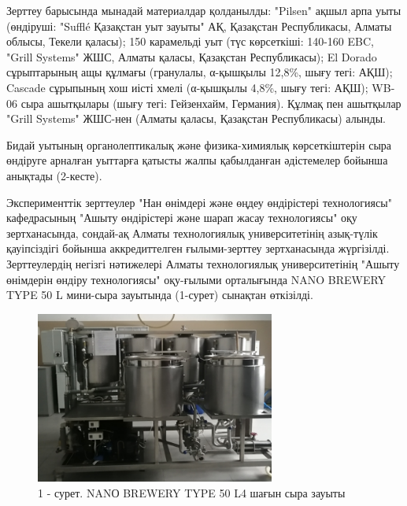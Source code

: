 \begin{multicols}{2}
Зерттеу барысында мынадай материалдар қолданылды: "Pilsen" ақшыл арпа
уыты (өндіруші: "Sufflé Қазақстан уыт зауыты" АҚ, Қазақстан
Республикасы, Алматы облысы, Текели қаласы); 150 карамельді уыт (түс
көрсеткіші: 140-160 EBC, "Grill Systems" ЖШС, Алматы қаласы, Қазақстан
Республикасы); El Dorado сұрыптарының ащы құлмағы (гранулалы, α-қышқылы
12,8\%, шығу тегі: АҚШ); Cascade сұрыпының хош иісті хмелі (α-қышқылы
4,8\%, шығу тегі: АҚШ); WB-06 сыра ашытқылары (шығу тегі: Гейзенхайм,
Германия). Құлмақ пен ашытқылар "Grill Systems" ЖШС-нен (Алматы қаласы,
Қазақстан Республикасы) алынды.

Бидай уытының органолептикалық және физика-химиялық көрсеткіштерін сыра
өндіруге арналған уыттарға қатысты жалпы қабылданған әдістемелер бойынша
анықтады (2-кесте).

Эксперименттік зерттеулер "Нан өнімдері және өңдеу өндірістері
технологиясы" кафедрасының "Ашыту өндірістері және шарап жасау
технологиясы" оқу зертханасында, сондай-ақ Алматы технологиялық
университетінің азық-түлік қауіпсіздігі бойынша аккредиттелген
ғылыми-зерттеу зертханасында жүргізілді. Зерттеулердің негізгі
нәтижелері Алматы технологиялық университетінің "Ашыту өнімдерін өндіру
технологиясы" оқу-ғылыми орталығында NANO BREWERY TYPE 50 L мини-сыра
зауытында (1-сурет) сынақтан өткізілді.
\end{multicols}

\begin{figure}[H]
	\centering
	\includegraphics[width=0.7\textwidth]{media/pish3/image4}
	\caption*{1 - сурет. NANО BREWERY TYPE 50 L4 шағын сыра зауыты}
\end{figure}

